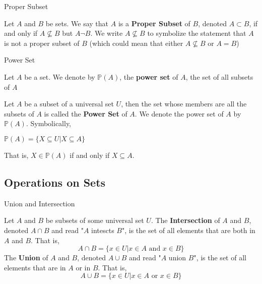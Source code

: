\begin{definition}
Proper Subset \\

\begin{tcolorbox}
    Let $A$ and $B$ be sets. We say that $A$ is a \textbf{Proper Subset} of $B$, denoted $A \subset B$, if and only if $A \nsubseteq B$ but $A \neg B$. We write $A \nsubseteq B$ to symbolize the statement that $A$ is not a proper subset of $B$ (which could mean that either $A \nsubseteq B$ or $A = B$)
\end{tcolorbox}
\end{definition}

\begin{definition}
Power Set \\

\begin{tcolorbox}
Let $A$ be a set. We denote by $\mathbb{P}(A)$, the \textbf{power set} of $A$, the set of all subsets of $A$

Let $A$ be a subset of a universal set $U$, then the set whose members are all the subsets of $A$ is called the \textbf{Power Set} of $A$. We denote the power set of $A$ by $\mathbb{P}(A)$. Symbolically,
    \begin{center}
        $\mathbb{P}(A) = \{ X \subseteq U | X \subseteq A \}$ 
    \end{center}
That is, $X \in \mathbb{P}(A)$ if and only if $X \subseteq A$. 
\end{tcolorbox}

\end{definition}


\subsection{Operations on Sets}

\begin{definition}
Union and Intersection \\

\begin{tcolorbox}
    Let $A$ and $B$ be subsets of some universal set $U$. The \textbf{Intersection} of $A$ and $B$, denoted $A \cap B$ and read "$A$ intescts $B$", is the set of all elements that are both in $A$ and $B$. That is,
        \begin{equation*}
            A \cap B = \{x \in U | x \in A \text{ and } x \in B \}
        \end{equation*}
    The \textbf{Union} of $A$ and $B$, denoted $A \cup B$ and read "$A$ union $B$", is the set  of all elements that are in $A$ or in $B$. That is,
     \begin{equation*}
            A \cup B = \{x \in U | x \in A \text{ or } x \in B \}
        \end{equation*}
\end{tcolorbox}
\end{definition}

